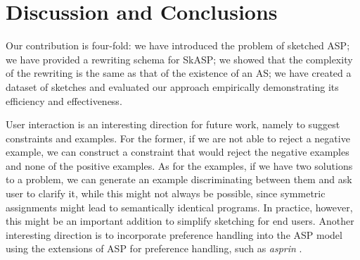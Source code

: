 




\section{Discussion and Conclusions}\label{sec:discussion}
Our contribution is four-fold: we have introduced the problem of sketched ASP; we have provided a rewriting schema for SkASP; we showed that the complexity of the rewriting is the same as that of the existence of an AS; we have created a dataset of sketches and evaluated our approach empirically demonstrating its efficiency and effectiveness.

User interaction is an interesting direction for future work, namely to suggest constraints and examples. For the former, if we are not able to reject a negative example, we can construct a constraint that would reject the negative examples and none of the positive examples. As for the examples, if we have two solutions to a problem, we can generate an example discriminating between them and ask user to clarify it, while this might not always be possible, since symmetric assignments might lead to semantically identical programs. In practice, however, this might be an important addition to simplify sketching for end users. Another interesting direction is to incorporate  preference handling  into the ASP model using the extensions of ASP for preference handling, such as \textit{asprin} \parencite{asprin}.



\cleardoublepage


